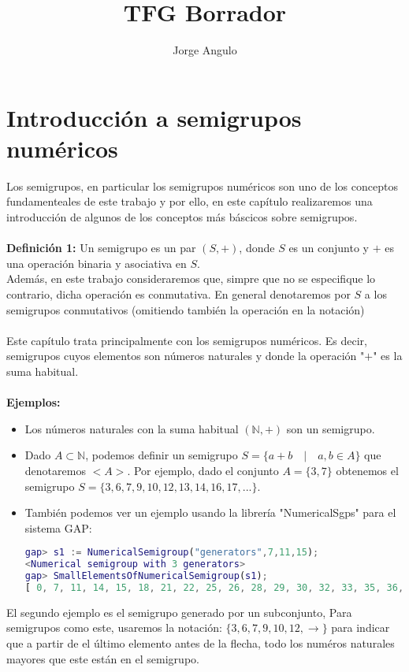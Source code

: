 \documentclass[10pt,spanish]{book}
\author{Jorge Angulo}
\title{TFG Borrador}
\begin{document}
\maketitle
\chapter{Introducción a semigrupos numéricos}

Los semigrupos, en particular los semigrupos numéricos son uno de los conceptos fundamenteales de este trabajo y por ello, en este capítulo realizaremos una introducción de algunos de los conceptos más báscicos sobre semigrupos.\\
\\ \textbf{Definición 1:} Un semigrupo es un par $(S, +)$, donde $S$ es un conjunto y $\textbf{+}$ es una operación binaria y asociativa en $S$.\\ Además, en este trabajo  consideraremos que, simpre que no se especifique lo contrario, dicha operación es conmutativa. En general denotaremos por $S$ a los semigrupos conmutativos (omitiendo también la operación en la notación)\\
\\Este capítulo trata principalmente con los semigrupos numéricos. Es decir, semigrupos cuyos elementos son números naturales y donde la operación "$+$" es la suma habitual. \\ 
\\ \textbf{Ejemplos:} 
\begin{itemize}
	\item Los números naturales con la suma habitual $(\mathbb{N}, +)$ son un semigrupo.
	\item Dado $A\subset\mathbb{N}$, podemos definir un semigrupo $S=\{a+b\quad |\quad a, b\in A \}$ que denotaremos $<A>$. Por ejemplo, dado el conjunto $A=\{3,7\}$ obtenemos el semigrupo $S=\{3,6,7,9,10,12,13,14,16,17,...\}$. 
	\item También podemos ver un ejemplo usando la librería "NumericalSgps" para el sistema GAP:\\
	\begin{lstlisting}[language=gap]
gap> s1 := NumericalSemigroup("generators",7,11,15);
<Numerical semigroup with 3 generators>
gap> SmallElementsOfNumericalSemigroup(s1);
[ 0, 7, 11, 14, 15, 18, 21, 22, 25, 26, 28, 29, 30, 32, 33, 35, 36, 37, 39 ]
	\end{lstlisting}
\end{itemize}
El segundo ejemplo es el semigrupo generado por un subconjunto, Para semigrupos como este, usaremos la notación: $\{3,6,7,9,10,12,\rightarrow \}$ para indicar que a partir de el último elemento antes de la flecha, todo los numéros naturales mayores que este están en el semigrupo.\\
\end{document}
